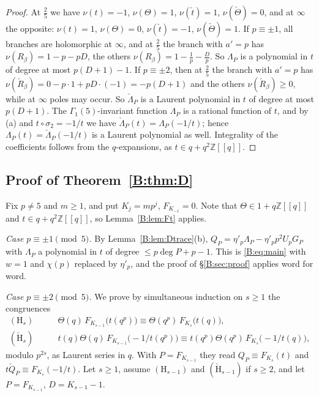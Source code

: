 \documentclass[11pt,a4paper]{article}
\theoremstyle{definition}\newtheorem{definition}[theorem]{Definition}
\theoremstyle{remark}\newtheorem{remark}[theorem]{Remark}
\newcommand{\Z}{\mathbb Z}
\numberwithin{equation}{section}
\begin{document}
\begin{proof}
At $\frac25$ we have $\nu(t)=-1$, $\nu(\Theta)=1$, $\nu(\check t)=1$, $\nu(\check\Theta)=0$, and at $\infty$ the opposite:
$\nu(t)=1$, $\nu(\Theta)=0$, $\nu(\check t)=-1$, $\nu(\check\Theta)=1$. If $p\equiv\pm1$, all branches are holomorphic at
$\infty$, and at $\frac25$ the branch with $a'=p$ has $\nu(R_\beta)=1-p-pD$, the others $\nu(R_\beta)=1-\frac1p-\frac Dp$.
So $\Lambda_P$ is a polynomial in $t$ of degree at most $p(D+1)-1$. If $p\equiv\pm2$, then at $\frac25$ the branch with $a'=p$
has $\nu(\check R_\beta)=0-p\cdot1+pD\cdot(-1)=-p(D+1)$ and the others $\nu(\check R_\beta)\ge0$, while at
$\infty$ poles may occur. So $\check\Lambda_P$ is a Laurent polynomial in $t$ of degree at most $p(D+1)$. The
$\Gamma_1(5)$-invariant function $\Lambda_P$ is a rational function of $t$, and by (a) and $t\circ\sigma_2=-1/t$ we have
$\check\Lambda_P(t)=\Lambda_P(-1/t)$; hence $\Lambda_P(t)=\check\Lambda_P(-1/t)$ is a Laurent polynomial as well.
Integrality of the coefficients follows from the $q$-expansions, as $t\in q+q^2\Z[[q]]$.
\end{proof}

\subsection{Proof of Theorem~\ref{B:thm:D}}
Fix $p\ne5$ and $m\ge1$, and put $K_j=mp^j$, $F_{K_{-1}}=0$. Note that $\Theta\in1+q\Z[[q]]$ and $t\in q+q^2\Z[[q]]$, so
Lemma~\ref{B:lem:Ft} applies.

\emph{Case $p\equiv\pm1\pmod5$.} By Lemma~\ref{B:lem:Dtrace}(b), $Q_P=\eta'_p\Lambda_P-\eta'_pp^2U_pG_P$ with $\Lambda_P$ a
polynomial in $t$ of degree $\le p\deg P+p-1$. This is \eqref{B:eq:main} with $w=1$ and $\chi(p)$ replaced by $\eta'_p$, and the
proof of \S\ref{B:sec:proof} applies word for word.

\emph{Case $p\equiv\pm2\pmod5$.} We prove by simultaneous induction on $s\ge1$ the congruences
\begin{align*}
(\mathrm H_s)&\qquad \Theta(q)\,F_{K_{s-1}}\bigl(t(q^p)\bigr)\equiv\Theta(q^p)\,F_{K_s}\bigl(t(q)\bigr),\\
(\check{\mathrm H}_s)&\qquad t(q)\Theta(q)\,F_{K_{s-1}}\bigl(-1/t(q^p)\bigr)\equiv t(q^p)\Theta(q^p)\,F_{K_s}\bigl(-1/t(q)\bigr),
\end{align*}
modulo $p^{2s}$, as Laurent series in $q$. With $P=F_{K_{s-1}}$ they read $Q_P\equiv F_{K_s}(t)$ and
$t\check Q_P\equiv F_{K_s}(-1/t)$. Let $s\ge1$, assume $(\mathrm H_{s-1})$ and $(\check{\mathrm H}_{s-1})$ if $s\ge2$, and
let $P=F_{K_{s-1}}$, $D=K_{s-1}-1$.
\end{document}
